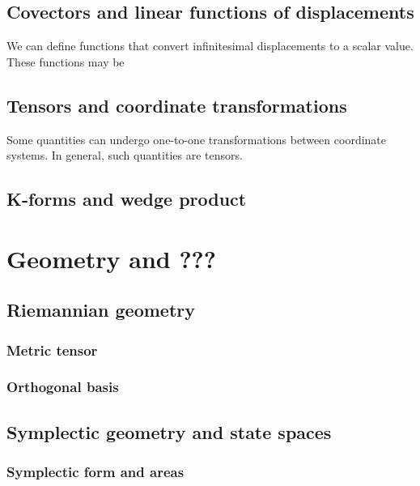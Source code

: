 \documentclass{book}
\begin{document}
\section{Covectors and linear functions of displacements}
We can define functions that convert infinitesimal displacements to a scalar value. These functions may be 
\section{Tensors and coordinate transformations}
Some quantities can undergo one-to-one transformations between coordinate systems. In general, such quantities are tensors. 
\section{K-forms and wedge product}

\chapter{Geometry and ???}
\section{Riemannian geometry}
\subsection{Metric tensor}
\subsection{Orthogonal basis}
\section{Symplectic geometry and state spaces}
\subsection{Symplectic form and areas}
\end{document}
